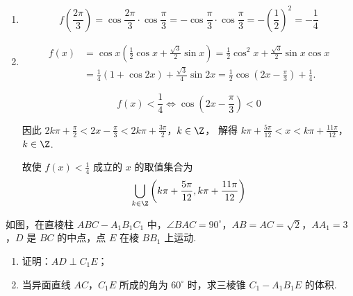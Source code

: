 \begin{solution}
\begin{enumerate}
\item
\[
f\left(\frac{2\pi}{3}\right)=\cos\frac{2\pi}{3}\cdot\cos\frac{\pi}{3}=-\cos\frac{\pi}{3}\cdot\cos\frac{\pi}{3}=-\left(\frac{1}{2}\right)^2=-\frac{1}{4}
\]

\item
\[
\begin{aligned}
f(x)&=\cos x\left(\frac{1}{2}\cos x+\frac{\sqrt{3}}{2}\sin x\right)=\frac{1}{2}\cos^2x+\frac{\sqrt{3}}{2}\sin x\cos x\\
&=\frac{1}{4}(1+\cos2x)+\frac{\sqrt{3}}{4}\sin2x=\frac{1}{2}\cos\left(2x-\frac{\pi}{3}\right)+\frac{1}{4}.
\end{aligned}
\]

\[
f(x)<\frac{1}{4}\iff \cos\left(2x-\frac{\pi}{3}\right)<0
\]

因此
\(2k\pi+\frac{\pi}{2}<2x-\frac{\pi}{3}<2k\pi+\frac{3\pi}{2}\)，\(k\in\Z\)，
解得
\(k\pi+\frac{5\pi}{12}<x<k\pi+\frac{11\pi}{12}\)，\(k\in\Z\).

故使 \(f(x)<\frac{1}{4}\) 成立的 \(x\) 的取值集合为
\[
\bigcup_{k\in\Z}\left(k\pi+\frac{5\pi}{12}, k\pi+\frac{11\pi}{12}\right)
\]
\end{enumerate}
\end{solution}

\begin{problem}
如图，在直棱柱 \(ABC - A_{1}B_{1}C_{1}\) 中，\(\angle BAC = 90^{\circ}\)，\(AB = AC = \sqrt{2}\)，\(AA_{1} = 3\)，\(D\) 是 \(BC\) 的中点，点 \(E\) 在棱 \(BB_{1}\) 上运动.

\begin{enumerate}
\item 证明：\(AD \perp C_{1}E\)；
\item 当异面直线 \(AC\)，\(C_1E\) 所成的角为 \(60^\circ\) 时，求三棱锥 \(C_1 - A_1B_1E\) 的体积.
\end{enumerate}

\end{problem}

